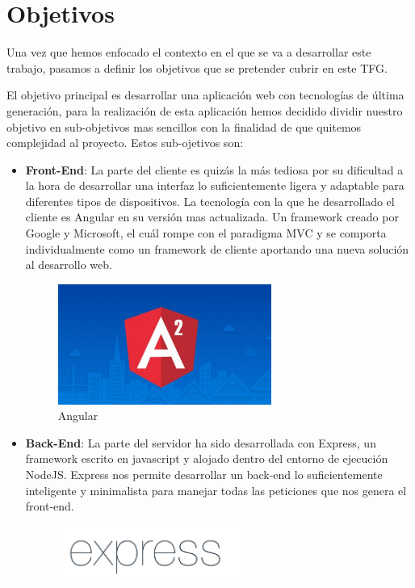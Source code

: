 \chapter{Objetivos}

Una vez que hemos enfocado el contexto en el que se va a desarrollar este trabajo, pasamos a definir los objetivos que se pretender cubrir en este TFG.

El objetivo principal es desarrollar una aplicación web con tecnologías de última generación, para la realización de esta aplicación hemos decidido dividir nuestro objetivo en sub-objetivos mas sencillos con la finalidad de que quitemos complejidad al proyecto. Estos sub-ojetivos son:
\begin{itemize}

    \item \textbf {Front-End}: La parte del cliente es quizás la más tediosa por su dificultad a la hora de desarrollar una interfaz lo suficientemente ligera y adaptable para diferentes tipos de dispositivos. La tecnología con la que he desarrollado el cliente es Angular en su versión mas actualizada. Un framework creado por Google y Microsoft, el cuál rompe con el paradigma MVC y se comporta individualmente como un framework de cliente aportando una nueva solución al desarrollo web.

\begin{figure}[H]
    \centering
    \includegraphics[width=70mm]{memoria/LaTeX/img/objetivos/a2.jpg}
    \caption{Angular}
\end{figure}

    \item \textbf {Back-End}: La parte del servidor ha sido desarrollada con Express, un framework escrito en javascript y alojado dentro del entorno de ejecución NodeJS. Express nos permite desarrollar un back-end lo suficientemente inteligente y minimalista para manejar todas las peticiones que nos genera el front-end.
    
\begin{figure}[H]
    \centering
    \includegraphics[width=60mm]{memoria/LaTeX/img/objetivos/express.png}
\end{figure}


\end{itemize}
